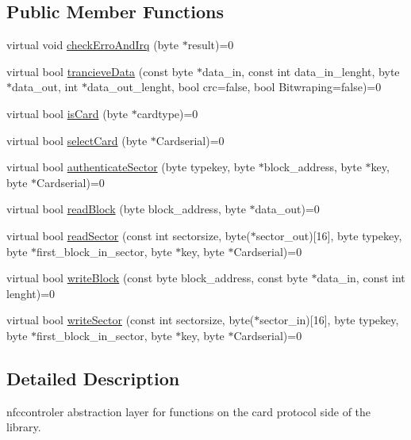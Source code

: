 \subsection*{Public Member Functions}
\begin{DoxyCompactItemize}
\item 
virtual void \hyperlink{classnfccontroler__limited_a97f279888626df09059338d149a3dcf1}{check\+Erro\+And\+Irq} (byte $\ast$result)=0
\item 
virtual bool \hyperlink{classnfccontroler__limited_a35a7cc1d586511b6a35294bc234530e0}{trancieve\+Data} (const byte $\ast$data\+\_\+in, const int data\+\_\+in\+\_\+lenght, byte $\ast$data\+\_\+out, int $\ast$data\+\_\+out\+\_\+lenght, bool crc=false, bool Bitwraping=false)=0
\item 
virtual bool \hyperlink{classnfccontroler__limited_ae1e689d34ba8bcd933c696b3f852dad6}{is\+Card} (byte $\ast$cardtype)=0
\item 
virtual bool \hyperlink{classnfccontroler__limited_a195f3de8d1529e00998f60ddf8058f6b}{select\+Card} (byte $\ast$Cardserial)=0
\item 
virtual bool \hyperlink{classnfccontroler__limited_a4eec4cf702e4c0062c33657e81a2069f}{authenticate\+Sector} (byte typekey, byte $\ast$block\+\_\+address, byte $\ast$key, byte $\ast$Cardserial)=0
\item 
virtual bool \hyperlink{classnfccontroler__limited_a5a8f607de57023a90962f6ac4fa2b5f1}{read\+Block} (byte block\+\_\+address, byte $\ast$data\+\_\+out)=0
\item 
virtual bool \hyperlink{classnfccontroler__limited_a70d6de379a501af2272da775c5d27c9e}{read\+Sector} (const int sectorsize, byte($\ast$sector\+\_\+out)\mbox{[}16\mbox{]}, byte typekey, byte $\ast$first\+\_\+block\+\_\+in\+\_\+sector, byte $\ast$key, byte $\ast$Cardserial)=0
\item 
virtual bool \hyperlink{classnfccontroler__limited_aeeeb82c8b45881239c7b2d9b4bce9ef5}{write\+Block} (const byte block\+\_\+address, const byte $\ast$data\+\_\+in, const int lenght)=0
\item 
virtual bool \hyperlink{classnfccontroler__limited_ad4d31d46ee21766eaaa0a4f1916cc8d8}{write\+Sector} (const int sectorsize, byte($\ast$sector\+\_\+in)\mbox{[}16\mbox{]}, byte typekey, byte $\ast$first\+\_\+block\+\_\+in\+\_\+sector, byte $\ast$key, byte $\ast$Cardserial)=0
\end{DoxyCompactItemize}


\subsection{Detailed Description}
nfccontroler abstraction layer for functions on the card protocol side of the library.

